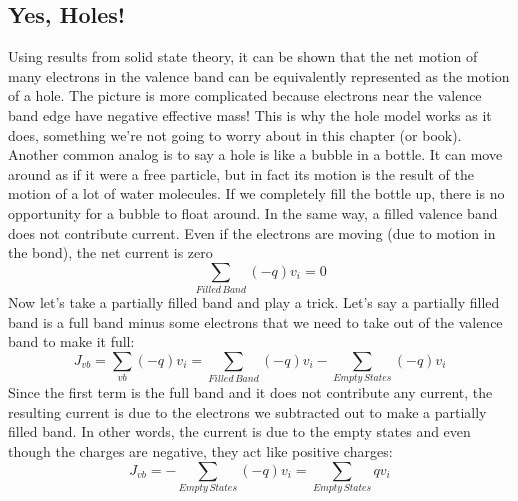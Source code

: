 \subsection{Yes, Holes!}
Using results from solid state theory, it can be shown that the net motion of many electrons in the valence band can be equivalently represented as the motion of a hole.  The picture is more complicated because electrons near the valence band edge have negative effective mass!  This is why the hole model works as it does, something we’re not going to worry about in this chapter (or book).  Another common analog is to say a hole is like a bubble in a bottle. It can move around as if it were a free particle, but in fact its motion is the result of the motion of a lot of water molecules.  If we completely fill the bottle up, there is no opportunity for a bubble to float around.  In the same way, a filled valence band does not contribute current.  Even if the electrons are moving (due to motion in the bond), the net current is zero
    \begin{equation}
        \sum\limits_{Filled\,Band} {( - q){v_i}} = 0
    \end{equation}
Now let’s take a partially filled band and play a trick.  Let’s say a partially filled band is a full band minus some electrons that we need to take out of the valence band to make it full: 
    \begin{equation}
        {J_{vb}} = \sum\limits_{vb} {( - q){v_i}}  = \sum\limits_{Filled\,Band} {( - q){v_i} - \sum\limits_{Empty\,States} {( - q){v_i}} }
    \end{equation}
Since the first term is the full band and it does not contribute any current, the resulting current is due to the electrons we subtracted out to make a partially filled band.  In other words, the current is due to the empty states and even though the charges are negative, they act like positive charges:
    \begin{equation}
        {J_{vb}} =  - \sum\limits_{Empty\,States} {( - q){v_i}}  = \sum\limits_{Empty\,States} {q{v_i}}
    \end{equation}
\newpage
